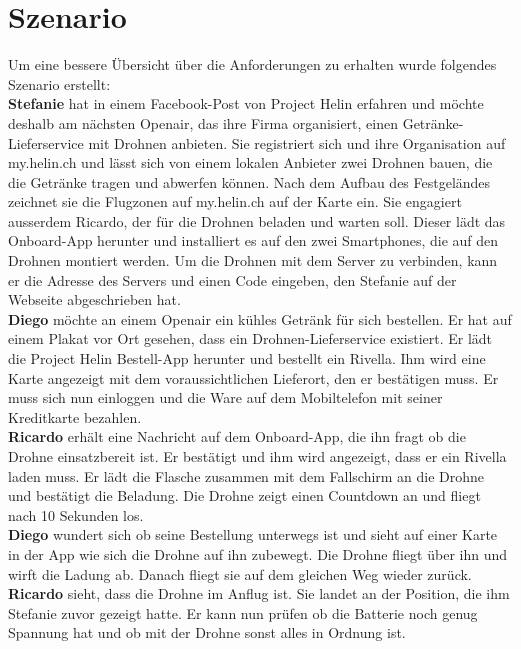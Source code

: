 \section{Szenario}

Um eine bessere Übersicht über die Anforderungen zu erhalten wurde folgendes Szenario erstellt:\\

\textbf{Stefanie} hat in einem Facebook-Post von Project Helin erfahren und möchte deshalb am nächsten Openair, das ihre Firma organisiert, einen Getränke-Lieferservice mit Drohnen anbieten. Sie registriert sich und ihre Organisation auf my.helin.ch und lässt sich von einem lokalen Anbieter zwei Drohnen bauen, die die Getränke tragen und abwerfen können. Nach dem Aufbau des Festgeländes zeichnet sie die Flugzonen auf my.helin.ch auf der Karte ein. Sie engagiert ausserdem Ricardo, der für die Drohnen beladen und warten soll. Dieser lädt das Onboard-App herunter und installiert es auf den zwei Smartphones, die auf den Drohnen montiert werden. Um die Drohnen mit dem Server zu verbinden, kann er die Adresse des Servers und einen Code eingeben, den Stefanie auf der Webseite abgeschrieben hat.\\

\textbf{Diego} möchte an einem Openair ein kühles Getränk für sich bestellen. Er hat auf einem Plakat vor Ort gesehen, dass ein Drohnen-Lieferservice existiert. Er lädt die Project Helin Bestell-App herunter und bestellt ein Rivella. Ihm wird eine Karte angezeigt mit dem voraussichtlichen Lieferort, den er bestätigen muss. Er muss sich nun einloggen und die Ware auf dem Mobiltelefon mit seiner Kreditkarte bezahlen.\\

\textbf{Ricardo} erhält eine Nachricht auf dem Onboard-App, die ihn fragt ob die Drohne einsatzbereit ist. Er bestätigt und ihm wird angezeigt, dass er ein Rivella laden muss. Er lädt die Flasche zusammen mit dem Fallschirm an die Drohne und bestätigt die Beladung. Die Drohne zeigt einen Countdown an und fliegt nach 10 Sekunden los. \\

\textbf{Diego} wundert sich ob seine Bestellung unterwegs ist und sieht auf einer Karte in der App wie sich die Drohne auf ihn zubewegt. Die Drohne fliegt über ihn und wirft die Ladung ab. Danach fliegt sie auf dem gleichen Weg wieder zurück.\\

\textbf{Ricardo} sieht, dass die Drohne im Anflug ist. Sie landet an der Position, die ihm Stefanie zuvor gezeigt hatte. Er kann nun prüfen ob die Batterie noch genug Spannung hat und ob mit der Drohne sonst alles in Ordnung ist.\\

